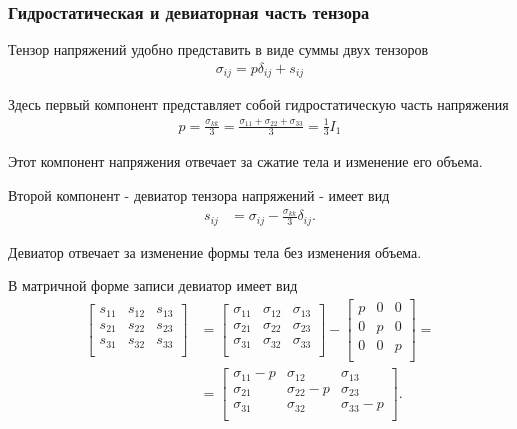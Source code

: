 \subsubsection{Гидростатическая и девиаторная часть тензора}

Тензор напряжений удобно представить в виде суммы двух тензоров
\begin{align}
\sigma_{ij}= p\delta_{ij} + s_{ij}
\end{align}

Здесь первый компонент представляет собой гидростатическую часть напряжения
\begin{align}
p=\frac{\sigma_{kk}}{3}=\frac{\sigma_{11}+\sigma_{22}+\sigma_{33}}{3}=\tfrac{1}{3}I_1
\end{align}

Этот компонент напряжения отвечает за сжатие тела и изменение его объема.

Второй компонент - девиатор тензора напряжений - имеет вид
\begin{align}
s_{ij} &= \sigma_{ij} - \frac{\sigma_{kk}}{3}\delta_{ij}.
\end{align}

Девиатор отвечает за изменение формы тела без изменения объема.

В матричной форме записи девиатор имеет вид
\begin{align}
\left[{\begin{matrix}
s_{11} & s_{12} & s_{13} \\
s_{21} & s_{22} & s_{23} \\
s_{31} & s_{32} & s_{33} \\
\end{matrix}}\right]
&=\left[{\begin{matrix}
\sigma_{11} & \sigma_{12} & \sigma_{13} \\
\sigma_{21} & \sigma_{22} & \sigma_{23} \\
\sigma_{31} & \sigma_{32} & \sigma_{33} \\
\end{matrix}}\right]-\left[{\begin{matrix}
p & 0 & 0 \\
0 & p & 0 \\
0 & 0 & p \\
\end{matrix}}\right] = \nonumber\\
&=\left[{\begin{matrix}
\sigma_{11}-p & \sigma_{12} & \sigma_{13} \\
\sigma_{21} & \sigma_{22}-p & \sigma_{23} \\
\sigma_{31} & \sigma_{32} & \sigma_{33}-p \\
\end{matrix}}\right].
\end{align}



